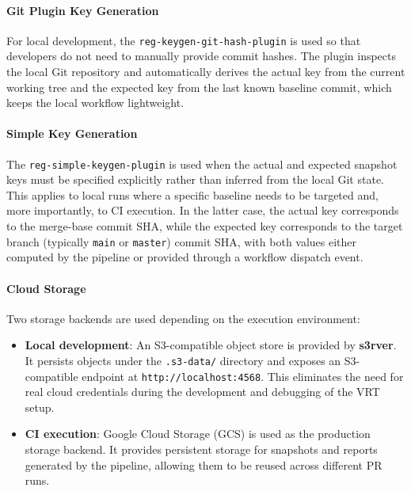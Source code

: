 \paragraph{Git Plugin Key Generation}

For local development, the \texttt{reg-keygen-git-hash-plugin} is used so that developers do not need to manually provide commit hashes. The plugin inspects the local Git repository and automatically derives the actual key from the current working tree and the expected key from the last known baseline commit, which keeps the local workflow lightweight.

\paragraph{Simple Key Generation}

The \texttt{reg-simple-keygen-plugin} is used when the actual and expected snapshot keys must be specified explicitly rather than inferred from the local Git state. This applies to local runs where a specific baseline needs to be targeted and, more importantly, to \ac{CI} execution. In the latter case, the actual key corresponds to the merge-base commit \ac{SHA}, while the expected key corresponds to the target branch (typically \texttt{main} or \texttt{master}) commit \ac{SHA}, with both values either computed by the pipeline or provided through a workflow dispatch event.

\paragraph{Cloud Storage}

Two storage backends are used depending on the execution environment:

\begin{itemize}
    \item \textbf{Local development}: An S3-compatible object store is provided by \textbf{s3rver}. It persists objects under the \texttt{.s3-data/} directory and exposes an S3-compatible endpoint at \texttt{http://localhost:4568}. This eliminates the need for real cloud credentials during the development and debugging of the \ac{VRT} setup.

    \item \textbf{\ac{CI} execution}: Google Cloud Storage (\ac{GCS}) is used as the production storage backend. It provides persistent storage for snapshots and reports generated by the pipeline, allowing them to be reused across different \ac{PR} runs.
\end{itemize}

